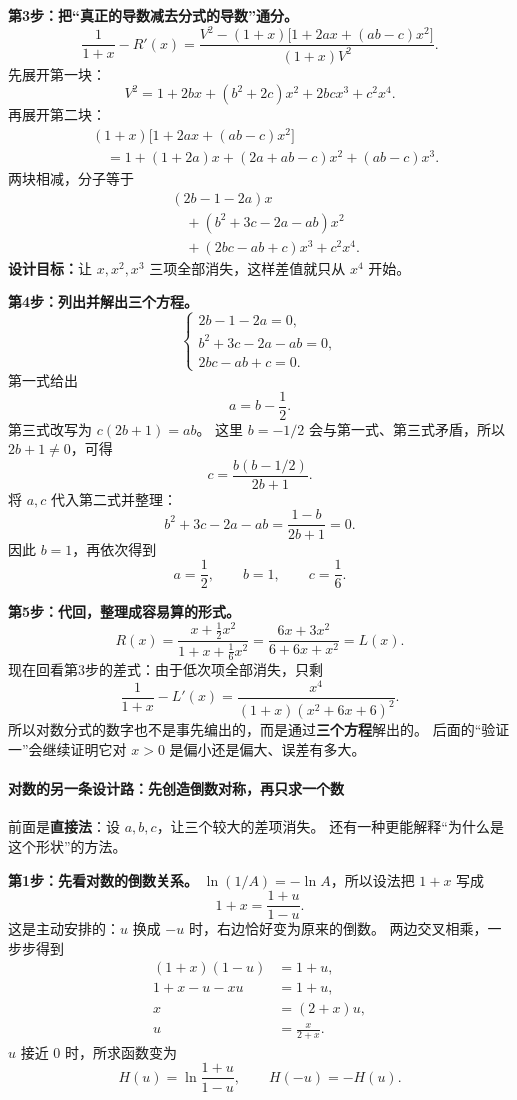 \begin{proofbox}
\textbf{第3步：把“真正的导数减去分式的导数”通分。}
\[
 \frac1{1+x}-R'(x)
 =\frac{V^2-(1+x)\bigl[1+2ax+(ab-c)x^2\bigr]}{(1+x)V^2}.
\]
先展开第一块：
\[
 V^2=1+2bx+(b^2+2c)x^2+2bcx^3+c^2x^4.
\]
再展开第二块：
\[
 \begin{aligned}
 &(1+x)\bigl[1+2ax+(ab-c)x^2\bigr]\\
 &\quad=1+(1+2a)x+(2a+ab-c)x^2+(ab-c)x^3.
 \end{aligned}
\]
两块相减，分子等于
\[
 \begin{aligned}
 &(2b-1-2a)x\\
 &\quad +(b^2+3c-2a-ab)x^2\\
 &\quad +(2bc-ab+c)x^3+c^2x^4.
 \end{aligned}
\]
\textbf{设计目标：}让 $x,x^2,x^3$ 三项全部消失，这样差值就只从 $x^4$ 开始。

\textbf{第4步：列出并解出三个方程。}
\[
 \begin{cases}
 2b-1-2a=0,\\
 b^2+3c-2a-ab=0,\\
 2bc-ab+c=0.
 \end{cases}
\]
第一式给出
\[
 \boxed{a=b-\frac12}.
\]
第三式改写为 $c(2b+1)=ab$。
这里 $b=-1/2$ 会与第一式、第三式矛盾，所以 $2b+1\ne0$，可得
\[
 \boxed{c=\frac{b(b-1/2)}{2b+1}}.
\]
将 $a,c$ 代入第二式并整理：
\[
 b^2+3c-2a-ab=\frac{1-b}{2b+1}=0.
\]
因此 $b=1$，再依次得到
\[
 \boxed{a=\frac12,\qquad b=1,\qquad c=\frac16}.
\]

\textbf{第5步：代回，整理成容易算的形式。}
\[
 R(x)=\frac{x+\frac12x^2}{1+x+\frac16x^2}
 =\boxed{\frac{6x+3x^2}{6+6x+x^2}}=L(x).
\]
现在回看第3步的差式：由于低次项全部消失，只剩
\[
 \frac1{1+x}-L'(x)=\frac{x^4}{(1+x)(x^2+6x+6)^2}.
\]
所以对数分式的数字也不是事先编出的，而是通过\textbf{三个方程}解出的。
后面的“验证一”会继续证明它对 $x>0$ 是偏小还是偏大、误差有多大。

\medskip

\paragraph{对数的另一条设计路：先创造倒数对称，再只求一个数}
前面是\textbf{直接法}：设 $a,b,c$，让三个较大的差项消失。
还有一种更能解释“为什么是这个形状”的方法。

\textbf{第1步：先看对数的倒数关系。}
$\ln(1/A)=-\ln A$，所以设法把 $1+x$ 写成
\[
 1+x=\frac{1+u}{1-u}.
\]
这是主动安排的：$u$ 换成 $-u$ 时，右边恰好变为原来的倒数。
两边交叉相乘，一步步得到
\[
 \begin{aligned}
 (1+x)(1-u)&=1+u,\\
 1+x-u-xu&=1+u,\\
 x&=(2+x)u,\\
 u&=\frac{x}{2+x}.
 \end{aligned}
\]
$u$ 接近 $0$ 时，所求函数变为
\[
 H(u)=\ln\frac{1+u}{1-u},\qquad H(-u)=-H(u).
\]


\end{proofbox}
